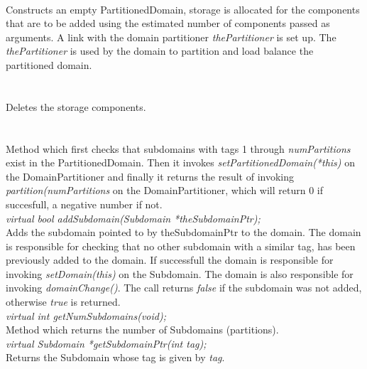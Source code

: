  \\ 
Constructs an empty PartitionedDomain, storage is allocated for the components
that are to be added using the estimated number of components passed
as arguments. A link with the domain partitioner {\em thePartitioner}
is set up. The {\em thePartitioner} is used by the domain to partition
and load balance the partitioned domain. \\


  \\
  \\
Deletes the storage components. \\

  \\
\\
Method which first checks that subdomains with tags 1 through {\em numPartitions} exist in the 
PartitionedDomain. Then it invokes {\em setPartitionedDomain(*this)} on the DomainPartitioner
and finally it returns the result of invoking {\em partition(numPartitions} on
the DomainPartitioner, which will return 0 if succesfull, a negative number if not. \\

{\em virtual bool addSubdomain(Subdomain *theSubdomainPtr);}  \\
Adds the subdomain pointed to by theSubdomainPtr to the domain. The domain
is responsible for checking that no other subdomain with a similar tag,
has been previously added to the domain. If successfull
the domain is responsible for invoking {\em setDomain(this)} on the
Subdomain. The domain is also responsible for invoking {\em
domainChange()}. The call returns {\em false} if the subdomain was not added, 
otherwise {\em true} is returned. \\  

{\em virtual int getNumSubdomains(void);}\\
Method which returns the number of Subdomains (partitions). \\

{\em virtual Subdomain *getSubdomainPtr(int tag);}\\
Returns the Subdomain whose tag is given by {\em tag}. \\

